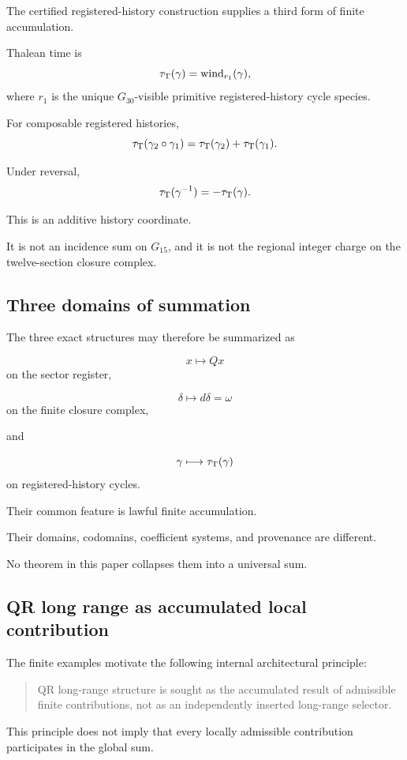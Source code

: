 The certified registered-history construction supplies a third form
of finite accumulation.

Thalean time is
\[
\tau_{\mathrm{T}}(\gamma)
=
\operatorname{wind}_{r_1}(\gamma),
\]
where \(r_1\) is the unique \(G_{30}\)-visible primitive
registered-history cycle species.

For composable registered histories,
\[
\tau_{\mathrm{T}}(\gamma_2\circ\gamma_1)
=
\tau_{\mathrm{T}}(\gamma_2)
+
\tau_{\mathrm{T}}(\gamma_1).
\]

Under reversal,
\[
\tau_{\mathrm{T}}(\gamma^{-1})
=
-\tau_{\mathrm{T}}(\gamma).
\]

This is an additive history coordinate.

It is not an incidence sum on \(G_{15}\), and it is not the regional
integer charge on the twelve-section closure complex.

\subsection{Three domains of summation}

The three exact structures may therefore be summarized as

\[
x
\longmapsto
Qx
\]
on the sector register,

\[
\delta
\longmapsto
d\delta=\omega
\]
on the finite closure complex,

and

\[
\gamma
\longmapsto
\tau_{\mathrm{T}}(\gamma)
\]
on registered-history cycles.

Their common feature is lawful finite accumulation.

Their domains, codomains, coefficient systems, and provenance are
different.

No theorem in this paper collapses them into a universal sum.

\subsection{QR long range as accumulated local contribution}

The finite examples motivate the following internal architectural
principle:

\begin{quote}
QR long-range structure is sought as the accumulated result of
admissible finite contributions, not as an independently inserted
long-range selector.
\end{quote}

This principle does not imply that every locally admissible
contribution participates in the global sum.

